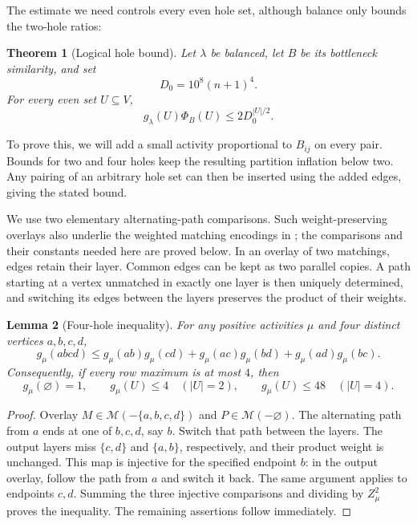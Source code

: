 \documentclass[11pt]{article}
\newtheorem{theorem}{Theorem}[section]
\newtheorem{lemma}[theorem]{Lemma}
\theoremstyle{definition}
\theoremstyle{remark}
\numberwithin{equation}{section}
\begin{document}
The estimate we need controls every even hole set, although balance
only bounds the two-hole ratios:

\begin{theorem}[Logical hole bound]
\label{thm:logical-hole-bound}
Let $\lambda$ be balanced, let $B$ be its bottleneck similarity, and set
\[
 D_0=10^8(n+1)^4.
\]
For every even set $U\subseteq V$,
\begin{equation}
\label{eq:logical-hole-bound}
 g_\lambda(U)\Phi_B(U)\le 2D_0^{|U|/2}.
\end{equation}
\end{theorem}

To prove this, we will add a small activity proportional to $B_{ij}$
on every pair. Bounds for two and four holes keep the resulting
partition inflation below two. Any pairing of an arbitrary hole set
can then be inserted using the added edges, giving the stated bound.

We use two elementary alternating-path comparisons. Such weight-preserving
overlays also underlie the weighted matching encodings in
\cite{JerrumSinclair1989,JerrumSinclairVigoda2004}; the comparisons and
their constants needed here are proved below. In an overlay of
two matchings, edges retain their layer.  Common edges can be kept as
two parallel copies.  A path starting at a vertex unmatched in exactly
one layer is then uniquely determined, and switching its edges between
the layers preserves the product of their weights.

\begin{lemma}[Four-hole inequality]
\label{lem:four-holes}
For any positive activities $\mu$ and four distinct vertices $a,b,c,d$,
\[
 g_\mu(abcd)\le
 g_\mu(ab)g_\mu(cd)+g_\mu(ac)g_\mu(bd)
                         +g_\mu(ad)g_\mu(bc).
\]
Consequently, if every row maximum is at most $4$, then
\begin{equation}
\label{eq:small-hole-bounds}
 g_\mu(\varnothing)=1,\qquad
 g_\mu(U)\le4\quad(|U|=2),\qquad
 g_\mu(U)\le48\quad(|U|=4).
\end{equation}
\end{lemma}

\begin{proof}
Overlay $M\in\mathcal M(-\{a,b,c,d\})$ and
$P\in\mathcal M(-\varnothing)$.  The alternating path from $a$ ends at
one of $b,c,d$, say $b$.  Switch that path between the layers.  The
output layers miss $\{c,d\}$ and $\{a,b\}$, respectively, and their
product weight is unchanged.  This map is injective for the specified
endpoint $b$: in the output overlay, follow the path from $a$ and switch
it back.  The same argument applies to endpoints $c,d$.
Summing the three injective comparisons and dividing by $Z_\mu^2$
proves the inequality.  The remaining assertions follow immediately.
\end{proof}
\end{document}
